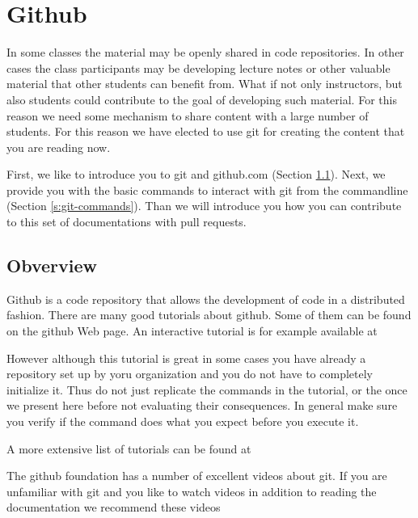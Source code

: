 \FILENAME

\chapter{Github}
\label{C:github}

In some classes the material may be openly shared in code
repositories. In other cases the class participants may be developing
lecture notes or other valuable material that other students can
benefit from. What if not only instructors, but also students could
contribute to the goal of developing such material. For this reason
we need some mechanism to share content with a large number of
students. For this reason we have elected to use git for creating the
content that you are reading now. 

First, we like to introduce you to git and github.com (Section
\ref{s:github}).  Next, we provide you with the basic commands to
interact with git from the commandline (Section
\ref{s:git-commands}). Than we will introduce you how you can contribute
to this set of documentations with pull requests.

\section{Obverview}\label{s:github}

Github is a code repository that allows the development of code in a
distributed fashion. There are many good tutorials about github.
Some of them can be found on the github Web page. An interactive
tutorial is for example available at


However although this tutorial is great in some cases you have already
a repository set up by yoru organization and you do not have to
completely initialize it. Thus do not just replicate the commands in
the tutorial, or the once we present here before not evaluating their
consequences. In general make sure you verify if the command does what
you expect before you execute it.

A more extensive list of tutorials can be found at


The github foundation has a number of excellent videos about git. If you
are unfamiliar with git and you like to watch videos in addition to
reading the documentation we recommend these videos


